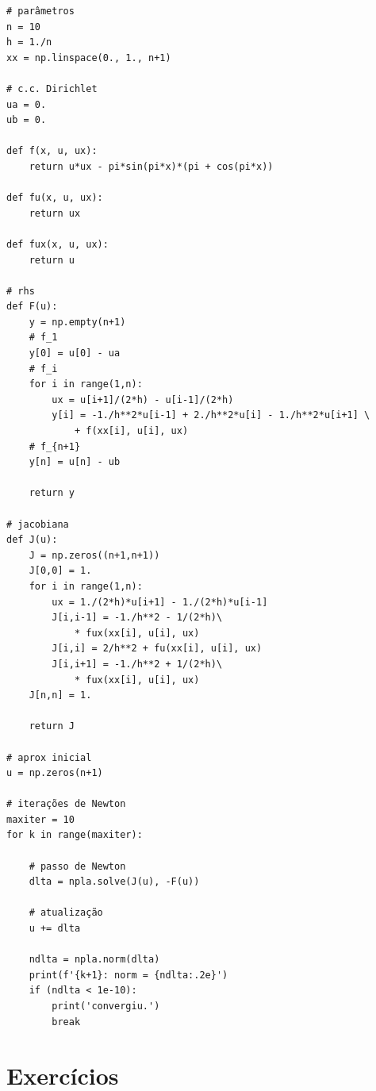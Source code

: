 \begin{ex}
\begin{lstlisting}[caption=mdf-newton.py]
# parâmetros
n = 10
h = 1./n
xx = np.linspace(0., 1., n+1)

# c.c. Dirichlet
ua = 0.
ub = 0.

def f(x, u, ux):
    return u*ux - pi*sin(pi*x)*(pi + cos(pi*x))

def fu(x, u, ux):
    return ux

def fux(x, u, ux):
    return u

# rhs
def F(u):
    y = np.empty(n+1)
    # f_1
    y[0] = u[0] - ua
    # f_i
    for i in range(1,n):
        ux = u[i+1]/(2*h) - u[i-1]/(2*h) 
        y[i] = -1./h**2*u[i-1] + 2./h**2*u[i] - 1./h**2*u[i+1] \
            + f(xx[i], u[i], ux)
    # f_{n+1}
    y[n] = u[n] - ub

    return y

# jacobiana
def J(u):
    J = np.zeros((n+1,n+1))
    J[0,0] = 1.
    for i in range(1,n):
        ux = 1./(2*h)*u[i+1] - 1./(2*h)*u[i-1]
        J[i,i-1] = -1./h**2 - 1/(2*h)\
            * fux(xx[i], u[i], ux)
        J[i,i] = 2/h**2 + fu(xx[i], u[i], ux)
        J[i,i+1] = -1./h**2 + 1/(2*h)\
            * fux(xx[i], u[i], ux)
    J[n,n] = 1.

    return J

# aprox inicial
u = np.zeros(n+1)

# iterações de Newton
maxiter = 10
for k in range(maxiter):

    # passo de Newton
    dlta = npla.solve(J(u), -F(u))

    # atualização
    u += dlta

    ndlta = npla.norm(dlta)
    print(f'{k+1}: norm = {ndlta:.2e}')
    if (ndlta < 1e-10):
        print('convergiu.')
        break
\end{lstlisting}
\end{ex}

\section{Exercícios}

